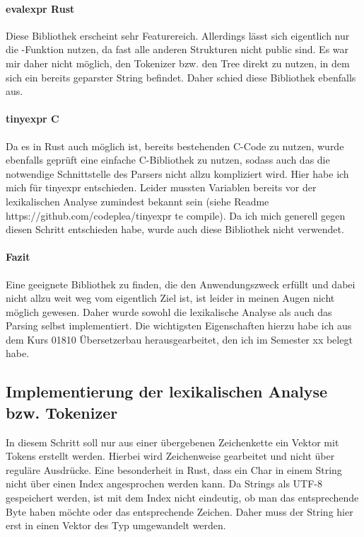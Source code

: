\documentclass[11pt,a4paper, ngerman]{article}
\begin{document}
\paragraph{evalexpr Rust} Diese Bibliothek erscheint sehr Featurereich. Allerdings lässt sich eigentlich nur die -Funktion nutzen, da fast alle anderen Strukturen nicht public sind. Es war mir daher nicht möglich, den Tokenizer bzw. den Tree direkt zu nutzen, in dem sich ein bereits geparster String befindet. Daher schied diese Bibliothek ebenfalls aus.

\paragraph{tinyexpr C} Da es in Rust auch möglich ist, bereits bestehenden C-Code zu nutzen, wurde ebenfalls geprüft eine einfache C-Bibliothek zu nutzen, sodass auch das die notwendige Schnittstelle des Parsers nicht allzu kompliziert wird. Hier habe ich mich für tinyexpr entschieden. Leider mussten Variablen bereits vor der lexikalischen Analyse zumindest bekannt sein (siehe Readme https://github.com/codeplea/tinyexpr te compile). Da ich mich generell gegen diesen Schritt entschieden habe, wurde auch diese Bibliothek nicht verwendet.

\paragraph{Fazit} Eine geeignete Bibliothek zu finden, die den Anwendungszweck erfüllt und dabei nicht allzu weit weg vom eigentlich Ziel ist, ist leider in meinen Augen nicht möglich gewesen. Daher wurde sowohl die lexikalische Analyse als auch das Parsing selbst implementiert. Die wichtigsten Eigenschaften hierzu habe ich aus dem Kurs 01810 Übersetzerbau herausgearbeitet, den ich im Semester xx belegt habe.

\subsection{Implementierung der lexikalischen Analyse bzw. Tokenizer} In diesem Schritt soll nur aus einer übergebenen Zeichenkette ein Vektor mit Tokens erstellt werden. Hierbei wird Zeichenweise gearbeitet und nicht über reguläre Ausdrücke. Eine besonderheit in Rust, dass ein Char in einem String nicht über einen Index angesprochen werden kann. Da Strings als UTF-8 gespeichert werden, ist mit dem Index nicht eindeutig, ob man das entsprechende Byte haben möchte oder das entsprechende Zeichen. Daher muss der String hier erst in einen Vektor des Typ  umgewandelt werden.
\end{document}
